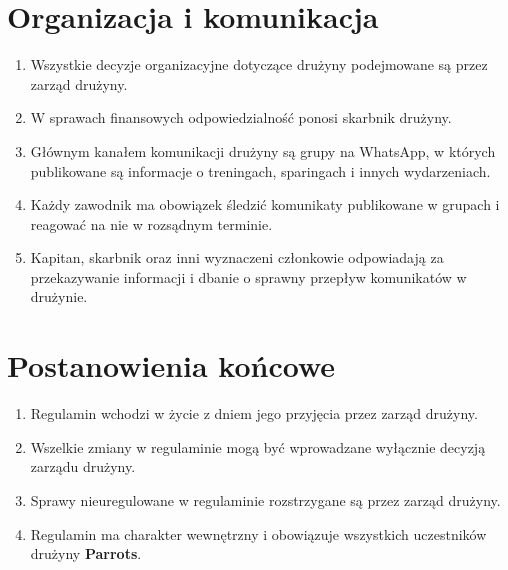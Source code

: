 \documentclass[12pt,a4paper]{article}
\let\stdsection\section
\renewcommand\section{\clearpage\stdsection}
\begin{document}
\section{Organizacja i komunikacja}
\begin{enumerate}
  \item Wszystkie decyzje organizacyjne dotyczące drużyny podejmowane są przez zarząd drużyny.
  \item W sprawach finansowych odpowiedzialność ponosi skarbnik drużyny.
  \item Głównym kanałem komunikacji drużyny są grupy na WhatsApp, w których publikowane są informacje o treningach, sparingach i innych wydarzeniach.
  \item Każdy zawodnik ma obowiązek śledzić komunikaty publikowane w grupach i reagować na nie w rozsądnym terminie.
  \item Kapitan, skarbnik oraz inni wyznaczeni członkowie odpowiadają za przekazywanie informacji i dbanie o sprawny przepływ komunikatów w drużynie.
\end{enumerate}

\section{Postanowienia końcowe}
\begin{enumerate}
  \item Regulamin wchodzi w życie z dniem jego przyjęcia przez zarząd drużyny.
  \item Wszelkie zmiany w regulaminie mogą być wprowadzane wyłącznie decyzją zarządu drużyny.
  \item Sprawy nieuregulowane w regulaminie rozstrzygane są przez zarząd drużyny.
  \item Regulamin ma charakter wewnętrzny i obowiązuje wszystkich uczestników drużyny \textbf{Parrots}.
\end{enumerate}
\end{document}
